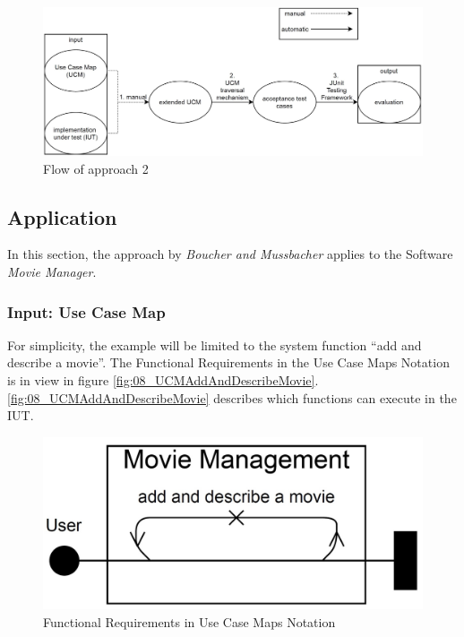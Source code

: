 \begin{figure}[h]
	\centering
	\includegraphics[scale=0.34]{../images/08/08_controllFlow2.jpg} 
	\caption{Flow of approach 2}
	\label{fig:08_flowOf2}
\end{figure}
\subsection{Application}

In this section, the approach by \textit{Boucher and Mussbacher} applies to the Software \textit{Movie Manager}.

\subsubsection{Input: Use Case Map}

For simplicity, the example will be limited to the system function \enquote{add and describe a movie}. The Functional Requirements in the Use Case Maps Notation is in view in figure \autoref{fig:08_UCMAddAndDescribeMovie}. \autoref{fig:08_UCMAddAndDescribeMovie} describes which functions can execute in the IUT.

\begin{figure}[h]
	\centering
	\includegraphics[scale=0.25]{../images/08/08_UCMAddAndDescribeMovie.jpg} 
	\caption{Functional Requirements in Use Case Maps Notation}
	\label{fig:08_UCMAddAndDescribeMovie}
\end{figure}

